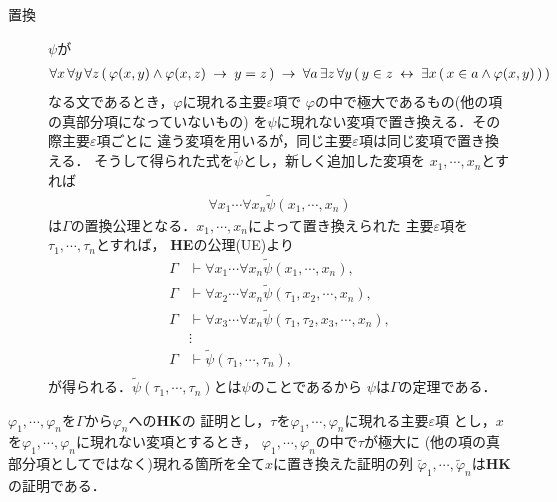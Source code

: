 \begin{sketch}
\begin{description}
			\item[置換] $\psi$が
				\begin{align}
					\forall x\, \forall y\, \forall z\, 
					(\, \varphi(x,y) \wedge \varphi(x,z)
					\hspace{0.25em}\rightarrow\hspace{0.25em} y = z\, )
					\hspace{0.25em}\rightarrow\hspace{0.25em} \forall a\, \exists z\, \forall y\,
					(\, y \in z \hspace{0.25em}\leftrightarrow\hspace{0.25em} \exists x\, (\, x \in a \wedge 
					\varphi(x,y)\, )\, )
				\end{align}
				なる文であるとき，$\varphi$に現れる主要$\varepsilon$項で
				$\varphi$の中で極大であるもの(他の項の真部分項になっていないもの)
				を$\psi$に現れない変項で置き換える．その際主要$\varepsilon$項ごとに
				違う変項を用いるが，同じ主要$\varepsilon$項は同じ変項で置き換える．
				そうして得られた式を$\tilde{\psi}$とし，新しく追加した変項を
				$x_{1},\cdots,x_{n}$とすれば
				\begin{align}
					\forall x_{1} \cdots \forall x_{n} \tilde{\psi}(x_{1},\cdots,x_{n})
				\end{align}
				は$\Gamma$の置換公理となる．$x_{1},\cdots,x_{n}$によって置き換えられた
				主要$\varepsilon$項を$\tau_{1},\cdots,\tau_{n}$とすれば，
				{\bf HE}の公理(UE)より
				\begin{align}
					\Gamma &\vdash \forall x_{1} \cdots \forall x_{n} \tilde{\psi}(x_{1},\cdots,x_{n}), \\
					\Gamma &\vdash \forall x_{2} \cdots \forall x_{n} \tilde{\psi}(\tau_{1},x_{2},\cdots,x_{n}), \\
					\Gamma &\vdash \forall x_{3} \cdots \forall x_{n} \tilde{\psi}(\tau_{1},\tau_{2},x_{3},\cdots,x_{n}), \\
					&\vdots \\
					\Gamma &\vdash \tilde{\psi}(\tau_{1},\cdots,\tau_{n}), \\
				\end{align}
				が得られる．$\tilde{\psi}(\tau_{1},\cdots,\tau_{n})$とは$\psi$のことであるから
				$\psi$は$\Gamma$の定理である．
				\QED
		\end{description}
	\end{sketch}
	
	\begin{screen}
		\begin{metathm}
		\label{metathm:Henkin_expansion_4}
			$\varphi_{1},\cdots,\varphi_{n}$を$\Gamma$から$\varphi_{n}$への{\bf HK}の
			証明とし，$\tau$を$\varphi_{1},\cdots,\varphi_{n}$に現れる主要$\varepsilon$項
			とし，$x$を$\varphi_{1},\cdots,\varphi_{n}$に現れない変項とするとき，
			$\varphi_{1},\cdots,\varphi_{n}$の中で$\tau$が極大に
			(他の項の真部分項としてではなく)現れる箇所を全て$x$に置き換えた証明の列
			$\tilde{\varphi}_{1},\cdots,\tilde{\varphi}_{n}$は{\bf HK}の証明である．
		\end{metathm}
	\end{screen}
	
